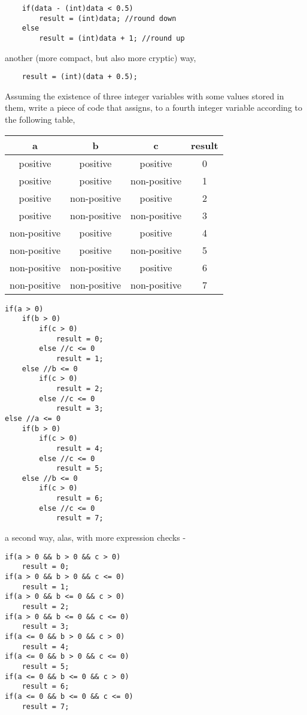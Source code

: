 \begin{questions}
\begin{solution}
\begin{lstlisting}
	if(data - (int)data < 0.5)
		result = (int)data; //round down
	else
		result = (int)data + 1; //round up
\end{lstlisting}

another (more compact, but also more cryptic) way,

\begin{lstlisting}
	result = (int)(data + 0.5);
\end{lstlisting}
\end{solution}  \question
Assuming the existence of three integer variables  with some values stored in them, write a piece of code that assigns, to a fourth integer variable  according to the following table,

\begin{tabular}{cccc}
  a & b & c & result\\
  \hline
  positive & positive & positive & 0\\
  positive & positive & non-positive & 1\\
  positive & non-positive & positive & 2\\
  positive & non-positive & non-positive & 3\\
  non-positive & positive & positive & 4\\
  non-positive & positive & non-positive & 5\\
  non-positive & non-positive & positive & 6\\
  non-positive & non-positive & non-positive & 7
  \end{tabular}

\begin{solution}
\begin{lstlisting}
if(a > 0)
	if(b > 0)
		if(c > 0)
			result = 0;
		else //c <= 0
			result = 1;
	else //b <= 0
		if(c > 0)
			result = 2;
		else //c <= 0
			result = 3;
else //a <= 0
	if(b > 0)
		if(c > 0)
			result = 4;
		else //c <= 0
			result = 5;
	else //b <= 0
		if(c > 0)
			result = 6;
		else //c <= 0
			result = 7;
\end{lstlisting}
a second way, alas, with more expression checks -

\begin{lstlisting}
if(a > 0 && b > 0 && c > 0)
	result = 0;
if(a > 0 && b > 0 && c <= 0)
	result = 1;
if(a > 0 && b <= 0 && c > 0)
	result = 2;
if(a > 0 && b <= 0 && c <= 0)
	result = 3;
if(a <= 0 && b > 0 && c > 0)
	result = 4;
if(a <= 0 && b > 0 && c <= 0)
	result = 5;
if(a <= 0 && b <= 0 && c > 0)
	result = 6;
if(a <= 0 && b <= 0 && c <= 0)
	result = 7;
\end{lstlisting}
\end{solution}

\end{questions}